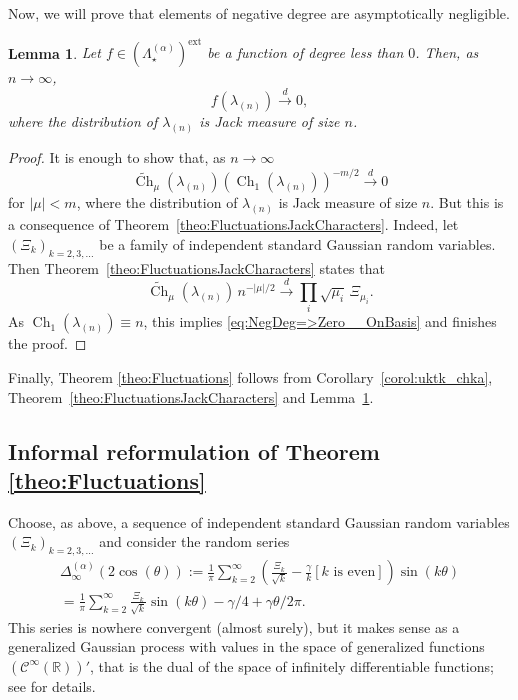 \documentclass[11pt]{amsart}
\theoremstyle{plain}
\newtheorem{lemma}{Lemma}[section]
\theoremstyle{remark}
\newcommand{\RR}{\mathbb{R}}
\newcommand{\Polaext}{\left(\Lambda_\star^{(\alpha)}\right)^{\ext}}
\DeclareMathOperator{\Ch}{Ch}
\DeclareMathOperator{\ext}{ext}
\begin{document}
Now, we will prove that 
elements of negative degree are asymptotically negligible.

\begin{lemma}
\label{lem:NegDeg=>Zero}
Let $f \in \Polaext$ be a function of degree less than $0$. Then, as $n \to \infty$,
\[ f(\lambda_{(n)}) \xrightarrow{d} 0,\]
where the distribution of $\lambda_{(n)}$ is Jack measure
of size $n$.
\end{lemma}

\begin{proof}
It is enough to show that, as $n \to \infty$
\begin{equation}\label{eq:NegDeg=>Zero__OnBasis}
 \widetilde{\Ch}_\mu(\lambda_{(n)}) \left(\Ch_1(\lambda_{(n)})\right)^{-m/2} \xrightarrow{d} 0
\end{equation}
for $|\mu| < m$, where the distribution of $\lambda_{(n)}$ is Jack measure
of size $n$. But this is a consequence of Theorem~\ref{theo:FluctuationsJackCharacters}. Indeed, let $\left(\Xi_k \right)_{k=2,3,\dots}$ be a family 
of independent standard Gaussian random variables. Then Theorem~\ref{theo:FluctuationsJackCharacters} states that
\[ \widetilde{\Ch}_\mu(\lambda_{(n)}) \, n^{-|\mu|/2} \xrightarrow{d} \prod_{i}\sqrt{\mu_i} \, \Xi_{\mu_i}.\]
As $\Ch_1(\lambda_{(n)}) \equiv n$, this implies \eqref{eq:NegDeg=>Zero__OnBasis} and finishes the proof.
\end{proof}

Finally, Theorem \ref{theo:Fluctuations} follows from
Corollary~\ref{corol:uktk_chka}, Theorem~\ref{theo:FluctuationsJackCharacters} and Lemma~\ref{lem:NegDeg=>Zero}.


\subsection{Informal reformulation of Theorem \ref{theo:Fluctuations}}
\label{subsect:informal}
Choose, as above, a sequence of independent standard Gaussian random variables $\left(\Xi_k \right)_{k=2,3,\dots}$
and consider the random series
\begin{multline*}
\Delta_\infty^{(\alpha)} (2 \cos(\theta) ):=
\frac{1}{\pi} \sum_{k=2}^\infty \left(\frac{\Xi_k}{\sqrt{k}}-\frac{\gamma}{k} [k\text{ is even}]\right) \sin(k \theta) \\
= \frac{1}{\pi} \sum_{k=2}^\infty \frac{\Xi_k}{\sqrt{k}} \sin(k \theta) - \gamma/4 +\gamma \theta/2\pi.
\end{multline*}
This series is nowhere convergent (almost surely),
but it makes sense as a generalized Gaussian process with values in
the space of generalized functions $(\mathcal{C}^\infty(\RR))'$,
that is the dual of the space of infinitely differentiable functions;
see \cite[Section 9]{IvanovOlshanski2002} for details.
\end{document}
